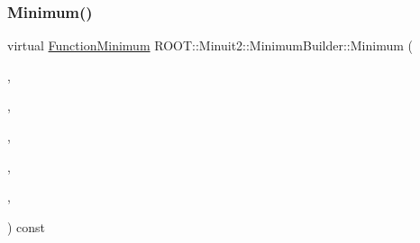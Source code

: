 \subsubsection{\texorpdfstring{Minimum()}{Minimum()}\hspace{0.1cm}{\footnotesize\ttfamily [2/3]}}
{\footnotesize\ttfamily virtual \mbox{\hyperlink{classROOT_1_1Minuit2_1_1FunctionMinimum}{Function\+Minimum}} R\+O\+O\+T\+::\+Minuit2\+::\+Minimum\+Builder\+::\+Minimum (\begin{DoxyParamCaption}\item[{const \mbox{\hyperlink{classROOT_1_1Minuit2_1_1MnFcn}{Mn\+Fcn}} \&}]{,  }\item[{const \mbox{\hyperlink{classROOT_1_1Minuit2_1_1GradientCalculator}{Gradient\+Calculator}} \&}]{,  }\item[{const \mbox{\hyperlink{classROOT_1_1Minuit2_1_1MinimumSeed}{Minimum\+Seed}} \&}]{,  }\item[{const \mbox{\hyperlink{classROOT_1_1Minuit2_1_1MnStrategy}{Mn\+Strategy}} \&}]{,  }\item[{unsigned int}]{,  }\item[{double}]{ }\end{DoxyParamCaption}) const\hspace{0.3cm}{\ttfamily [pure virtual]}}



